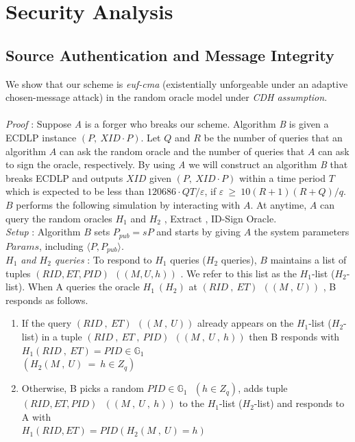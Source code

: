 \documentclass[10pt,journal,letterpaper]{IEEEtran}
\begin{document}
\section{Security Analysis}
\subsection{Source Authentication and Message Integrity}
We show that our scheme is \emph{euf-cma} (existentially unforgeable under an adaptive chosen-message attack) in the random oracle model under \emph{CDH assumption}. \\ \\
\emph{Proof} : Suppose \emph{A} is a forger who breaks our scheme.
Algorithm \emph{B} is given a ECDLP instance $(P ,\: XID \cdot P)$.
Let $Q$ and $R$ be the number of queries that an algorithm $A$ can
ask the random oracle and the number of queries that $A$ can ask to
sign the oracle, respectively. By using \emph{A} we will construct
an algorithm \emph{B} that breaks ECDLP and outputs $XID$ given $(P
,\: XID \cdot P)$ within a time period $T$ which is expected to be
less
than $120686\cdot QT/\varepsilon$, if $\varepsilon\: \geq\: 10(R+1)(R+Q)/q$. $B$ performs the following simulation by interacting with $A$. At anytime, $A$ can query the random oracles $H_1$ and $H_2$ , Extract , ID-Sign Oracle. \\

\noindent\emph{Setup} : Algorithm $B$ sets $P_{pub} = sP$ and starts by giving $A$ the system parameters $Params$, including $\langle P, P_{pub} \rangle$.\\

\noindent\emph{$H_1$ and $H_2$ queries} : To respond to $H_1$
queries ($H_2$ queries), $B$ maintains a list of tuples $(RID , ET ,
PID) \:\: ((M , U , h))$ . We refer to this list as the $H_1$-list
($H_2$-list). When A queries the oracle $H_1\:(H_2)$ at $(RID \:,
\:ET)\:\:((M\:,\:U))$ , B responds as follows.
\begin{enumerate}
    \item If the query $(RID\: , \: ET)\:\:((M\:,\:U))$ already appears on the $H_1$-list ($H_2$-list) in a tuple $(RID\: , \:ET \:, \:PID)\:\:((M\:,\:U\:,\:h))$ then B responds with $H_1(RID\:,\:ET) = PID\in \mathbb{G}_1$\:\:\:\\$(H_2(M\:,\:U)\:=\:h \in Z_q)$
    \item Otherwise, B picks a random $PID \in \mathbb{G}_1 \:\:\:(h\in Z_q)$, adds tuple $(RID , ET , PID)\:\:\: ((M\:,\:U\:,\:h))$ to the $H_1$-list ($H_2$-list) and responds to A with \\
    $H_1(RID , ET) = PID$\:\:\:$(H_2(M\:,\:U) = h)$ \\
\end{enumerate}
\end{document}
